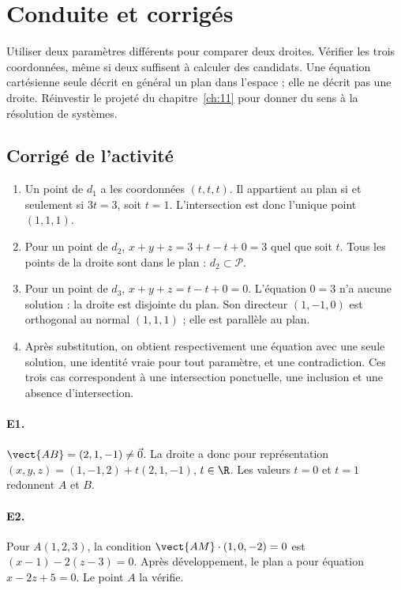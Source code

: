 \ifmxteacher\mxnewpage\section{Conduite et corrigés}\begin{teachernote}Utiliser deux paramètres différents pour comparer deux droites. Vérifier les trois coordonnées, même si deux suffisent à calculer des candidats. Une équation cartésienne seule décrit en général un plan dans l'espace ; elle ne décrit pas une droite. Réinvestir le projeté du chapitre~\ref{ch:11} pour donner du sens à la résolution de systèmes.\end{teachernote}

\subsection{Corrigé de l'activité}\begin{enumerate}
\item Un point de $d_1$ a les coordonnées $(t,t,t)$. Il appartient au plan si et seulement si $3t=3$, soit $t=1$. L'intersection est donc l'unique point $(1,1,1)$.
\item Pour un point de $d_2$, $x+y+z=3+t-t+0=3$ quel que soit $t$. Tous les points de la droite sont dans le plan : $d_2\subset\mathcal P$.
\item Pour un point de $d_3$, $x+y+z=t-t+0=0$. L'équation $0=3$ n'a aucune solution : la droite est disjointe du plan. Son directeur $(1,-1,0)$ est orthogonal au normal $(1,1,1)$ ; elle est parallèle au plan.
\item Après substitution, on obtient respectivement une équation avec une seule solution, une identité vraie pour tout paramètre, et une contradiction. Ces trois cas correspondent à une intersection ponctuelle, une inclusion et une absence d'intersection.
\end{enumerate}

\paragraph{E1.}$\vect{AB}=(2,1,-1)\ne\vec0$. La droite a donc pour représentation $(x,y,z)=(1,-1,2)+t(2,1,-1)$, $t\in\R$. Les valeurs $t=0$ et $t=1$ redonnent $A$ et $B$.

\paragraph{E2.}Pour $A(1,2,3)$, la condition $\vect{AM}\cdot(1,0,-2)=0$ est $(x-1)-2(z-3)=0$. Après développement, le plan a pour équation $x-2z+5=0$. Le point $A$ la vérifie.

